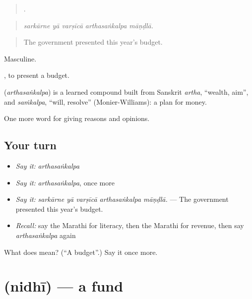 \begin{quote}
    .
\end{quote}

\begin{quote}
\emph{sarkārne yā varṣīcā arthasaṅkalpa māṇḍlā.}
\end{quote}

\begin{quote}
The government presented this year's budget.
\end{quote}

Masculine.

 , to present a budget.

\begin{cousinweb}
\textbf{} (\emph{arthasaṅkalpa}) is a learned compound built from Sanskrit \emph{artha}, \textquotedblleft{}wealth, aim\textquotedblright{}, and \emph{saṁkalpa}, \textquotedblleft{}will, resolve\textquotedblright{} (Monier-Williams): a plan for money.
\end{cousinweb}

\begin{grammarlens}[title={What you've built}]
One more word for giving reasons and opinions.
\end{grammarlens}

\subsection*{Your turn}
\begin{itemize}
\raggedright
  \item \emph{Say it:} \emph{arthasaṅkalpa}
  \item \emph{Say it:} \emph{arthasaṅkalpa}, once more
  \item \emph{Say it:} \emph{sarkārne yā varṣīcā arthasaṅkalpa māṇḍlā.} — The government presented this year's budget.
  \item \emph{Recall:} say the Marathi for literacy, then the Marathi for revenue, then say \emph{arthasaṅkalpa} again
\end{itemize}

\begin{tcolorbox}[breakable,colback=teal!4,colframe=teal!35!black,title={Before you move on}]
What does  mean? (\textquotedblleft{}A budget\textquotedblright{}.) Say it once more.
\end{tcolorbox}
\section[\texorpdfstring{\mr{निधी} (nidhī)}{निधी (nidhī)}]{ (nidhī) — a fund}

